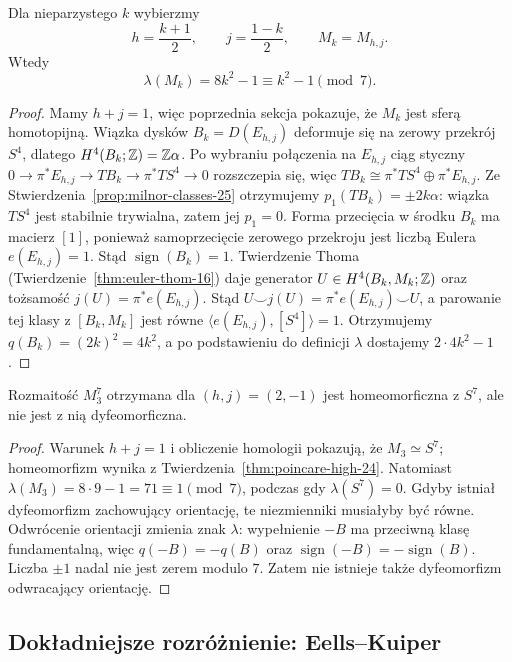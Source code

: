 \begin{stwierdzenie}
\label{prop:milnor-value-25}
Dla nieparzystego $k$ wybierzmy
\[
 h=\frac{k+1}{2},\qquad
 j=\frac{1-k}{2},
 \qquad M_k=M_{h,j}.
\]
Wtedy
\[
 \lambda(M_k)
 =8k^2-1\equiv k^2-1\pmod7.
\]
\end{stwierdzenie}
\begin{proof}
Mamy $h+j=1$, więc
poprzednia sekcja pokazuje,
że $M_k$ jest sferą homotopijną.
Wiązka dysków $B_k=D(E_{h,j})$
deformuje się na zerowy przekrój
$S^4$, dlatego
$H^4(B_k;\mathbb{Z})=\mathbb{Z}\alpha$.
Po wybraniu połączenia na $E_{h,j}$
ciąg styczny
$0\to\pi^*E_{h,j}\to TB_k
\to\pi^*TS^4\to0$
rozszczepia się, więc
$TB_k\cong\pi^*TS^4\oplus\pi^*E_{h,j}$.
Ze Stwierdzenia~\ref{prop:milnor-classes-25}
otrzymujemy
$p_1(TB_k)=\pm2k\alpha$:
wiązka $TS^4$ jest stabilnie
trywialna, zatem jej $p_1=0$.
Forma przecięcia w środku
$B_k$ ma macierz $[1]$,
ponieważ samoprzecięcie
zerowego przekroju jest liczbą
Eulera $e(E_{h,j})=1$.
Stąd $\operatorname{sign}(B_k)=1$.
Twierdzenie Thoma
(Twierdzenie~\ref{thm:euler-thom-16})
daje generator $U\in H^4(B_k,M_k;\mathbb{Z})$
oraz tożsamość $j(U)=\pi^*e(E_{h,j})$.
Stąd $U\smile j(U)=
\pi^*e(E_{h,j})\smile U$, a parowanie
tej klasy z $[B_k,M_k]$ jest równe
$\langle e(E_{h,j}),[S^4]\rangle=1$.
Otrzymujemy
$q(B_k)=(2k)^2=4k^2$,
a po podstawieniu do definicji
$\lambda$ dostajemy
$2\cdot4k^2-1$.
\end{proof}

\begin{twierdzenie}
\label{thm:exotic-milnor-25}
Rozmaitość $M_3^7$ otrzymana
dla $(h,j)=(2,-1)$
jest homeomorficzna z $S^7$,
ale nie jest z nią dyfeomorficzna.
\end{twierdzenie}
\begin{proof}
Warunek $h+j=1$ i obliczenie
homologii pokazują, że
$M_3\simeq S^7$; homeomorfizm
wynika z
Twierdzenia~\ref{thm:poincare-high-24}.
Natomiast
$\lambda(M_3)=8\cdot9-1=71
\equiv1\pmod7$, podczas gdy
$\lambda(S^7)=0$.
Gdyby istniał dyfeomorfizm
zachowujący orientację, te
niezmienniki musiałyby być równe.
Odwrócenie orientacji zmienia
znak $\lambda$: wypełnienie $-B$
ma przeciwną klasę fundamentalną,
więc $q(-B)=-q(B)$ oraz
$\operatorname{sign}(-B)
=-\operatorname{sign}(B)$.
Liczba $\pm1$
nadal nie jest zerem modulo $7$.
Zatem nie istnieje także
dyfeomorfizm odwracający
orientację.
\end{proof}

\subsection*{Dokładniejsze rozróżnienie: Eells--Kuiper}

